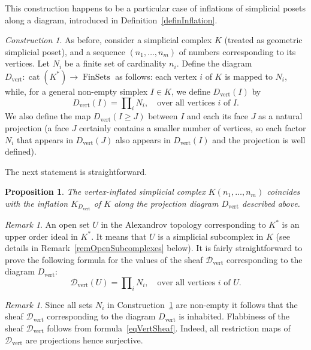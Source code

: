 \documentclass[english,12pt,oneside]{amsproc}
\DeclareMathOperator{\cat}{cat}
\DeclareMathOperator{\FinSets}{FinSets}
\DeclareMathOperator{\ver}{vert}
\newcommand{\ca}[1]{\mathcal{#1}}
\newcounter{stmcounter}[section]
\numberwithin{equation}{section}
\theoremstyle{plain}
\newtheorem{prop}[stmcounter]{Proposition}
\theoremstyle{definition}
\theoremstyle{remark}
\newtheorem{rem}[stmcounter]{Remark}
\newtheorem{con}[stmcounter]{Construction}
\begin{document}
This construction happens to be a particular case of inflations of simplicial posets along a diagram, introduced in Definition~\ref{definInflation}.

\begin{con}\label{conDiagramForVertexInflation}
As before, consider a simplicial complex $K$ (treated as geometric simplicial poset), and a sequence $(n_1,\ldots, n_m)$ of numbers corresponding to its vertices. Let $N_i$ be a finite set of cardinality $n_i$. Define the diagram $D_{\ver}\colon \cat(K^*)\to \FinSets$ as follows: each vertex $i$ of $K$ is mapped to $N_i$, while, for a general non-empty simplex $I\in K$, we define $D_{\ver}(I)$ by
\begin{equation}
    D_{\ver}(I) = \prod\nolimits_{i}N_i,\quad \text{over all vertices $i$ of $I$}.
\end{equation}
We also define the map $D_{\ver}(I\geq J)$ between $I$ and each its face $J$ as a natural projection (a face $J$ certainly contains a smaller number of vertices, so each factor $N_i$ that appears in $D_{\ver}(J)$ also appears in $D_{\ver}(I)$ and the projection is well defined).
\end{con}

The next statement is straightforward.

\begin{prop}\label{multiclique2}
The vertex-inflated simplicial complex $K(n_1,\ldots,n_m)$ coincides with the inflation $K_{D_{\ver}}$ of $K$ along the projection diagram $D_{\ver}$ described above.
\end{prop}

\begin{rem}
An open set $U$ in the Alexandrov topology corresponding to $K^*$ is an upper order ideal in $K^*$. It means that $U$ is a simplicial subcomplex in $K$ (see details in Remark~\ref{remOpenSubcomplexes} below). It is fairly straightforward to prove the following formula for the values of the sheaf $\ca{D}_{\ver}$ corresponding to the diagram $D_{\ver}$:
\begin{equation}\label{eqVertSheaf}
\ca{D}_{\ver}(U)=\prod\nolimits_{i}N_i,\quad \text{over all vertices $i$ of $U$}.
\end{equation}
\end{rem}

\begin{rem}\label{remVertexInflationFlabby}
Since all sets $N_i$ in Construction~\ref{conDiagramForVertexInflation} are non-empty it follows that the sheaf $\ca{D}_{\ver}$ corresponding to the diagram $D_{\ver}$ is inhabited. Flabbiness of the sheaf $\ca{D}_{\ver}$ follows from formula~\eqref{eqVertSheaf}. Indeed, all restriction maps of $\ca{D}_{\ver}$ are projections hence surjective.
\end{rem}
\end{document}
